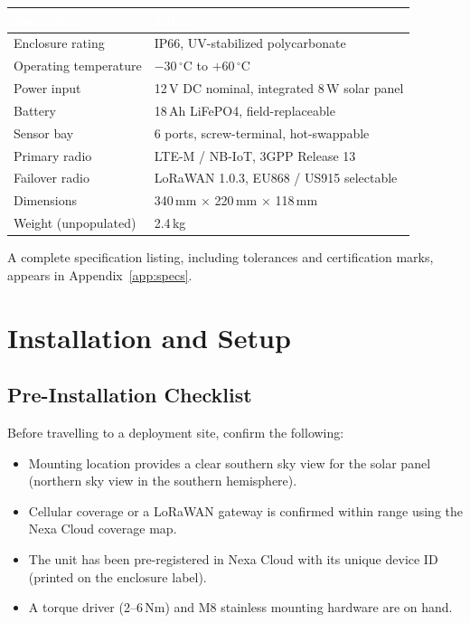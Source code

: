 \documentclass[11pt,a4paper,oneside,headings=big,chapterprefix=true]{scrreprt}
\begin{document}
\begin{center}
\renewcommand{\arraystretch}{1.25}
\begin{tabularx}{\textwidth}{@{}l X@{}}
\toprule
\rowcolor{steel}
\textcolor{white}{\bfseries Parameter} & \textcolor{white}{\bfseries Value} \\
\midrule
Enclosure rating & IP66, UV-stabilized polycarbonate \\
\rowcolor{fogbg}
Operating temperature & $-30\,^{\circ}\mathrm{C}$ to $+60\,^{\circ}\mathrm{C}$ \\
Power input & 12\,V DC nominal, integrated 8\,W solar panel \\
\rowcolor{fogbg}
Battery & 18\,Ah LiFePO4, field-replaceable \\
Sensor bay & 6 ports, screw-terminal, hot-swappable \\
\rowcolor{fogbg}
Primary radio & LTE-M / NB-IoT, 3GPP Release 13 \\
Failover radio & LoRaWAN 1.0.3, EU868 / US915 selectable \\
\rowcolor{fogbg}
Dimensions & 340\,mm $\times$ 220\,mm $\times$ 118\,mm \\
Weight (unpopulated) & 2.4\,kg \\
\bottomrule
\end{tabularx}
\end{center}

A complete specification listing, including tolerances and certification marks, appears in Appendix~\ref{app:specs}.

\chapter{Installation and Setup}
\label{ch:install}

\section{Pre-Installation Checklist}

Before travelling to a deployment site, confirm the following:

\begin{itemize}
  \item Mounting location provides a clear southern sky view for the solar panel (northern sky view in the southern hemisphere).
  \item Cellular coverage or a LoRaWAN gateway is confirmed within range using the Nexa Cloud coverage map.
  \item The unit has been pre-registered in Nexa Cloud with its unique device ID (printed on the enclosure label).
  \item A torque driver (2--6\,N\textperiodcentered m) and M8 stainless mounting hardware are on hand.
\end{itemize}
\end{document}
